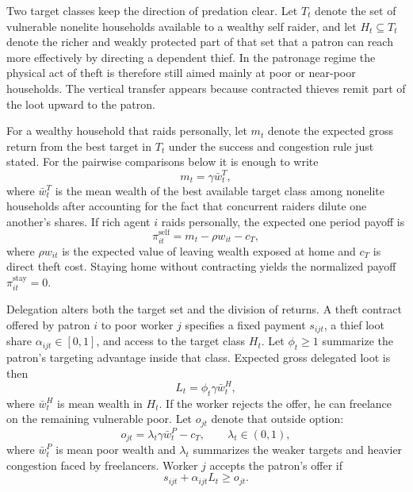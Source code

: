 Two target classes keep the direction of predation clear. Let $T_t$ denote the set of vulnerable nonelite households available to a wealthy self raider, and let $H_t \subseteq T_t$ denote the richer and weakly protected part of that set that a patron can reach more effectively by directing a dependent thief. In the patronage regime the physical act of theft is therefore still aimed mainly at poor or near-poor households. The vertical transfer appears because contracted thieves remit part of the loot upward to the patron.

For a wealthy household that raids personally, let $m_t$ denote the expected gross return from the best target in $T_t$ under the success and congestion rule just stated. For the pairwise comparisons below it is enough to write
\begin{equation}
m_t = \gamma \bar{w}^{T}_t,
\label{eq:mt}
\end{equation}
where $\bar{w}^{T}_t$ is the mean wealth of the best available target class among nonelite households after accounting for the fact that concurrent raiders dilute one another's shares. If rich agent $i$ raids personally, the expected one period payoff is
\begin{equation}
\pi^{\mathrm{self}}_{it} = m_t - \rho w_{it} - c_T,
\label{eq:personal-payoff}
\end{equation}
where $\rho w_{it}$ is the expected value of leaving wealth exposed at home and $c_T$ is direct theft cost. Staying home without contracting yields the normalized payoff $\pi^{\mathrm{stay}}_{it}=0$.

Delegation alters both the target set and the division of returns. A theft contract offered by patron $i$ to poor worker $j$ specifies a fixed payment $s_{ijt}$, a thief loot share $\alpha_{ijt}\in[0,1]$, and access to the target class $H_t$. Let $\phi_t\ge 1$ summarize the patron's targeting advantage inside that class. Expected gross delegated loot is then
\begin{equation}
L_t = \phi_t \gamma \bar{w}^{H}_t,
\label{eq:delegated-loot}
\end{equation}
where $\bar{w}^{H}_t$ is mean wealth in $H_t$. If the worker rejects the offer, he can freelance on the remaining vulnerable poor. Let $o_{jt}$ denote that outside option:
\begin{equation}
o_{jt} = \lambda_t \gamma \bar{w}^{P}_t - c_T,
\qquad \lambda_t \in (0,1),
\label{eq:outside-option}
\end{equation}
where $\bar{w}^{P}_t$ is mean poor wealth and $\lambda_t$ summarizes the weaker targets and heavier congestion faced by freelancers. Worker $j$ accepts the patron's offer if
\begin{equation}
s_{ijt} + \alpha_{ijt}L_t \ge o_{jt}.
\label{eq:IR}
\end{equation}

